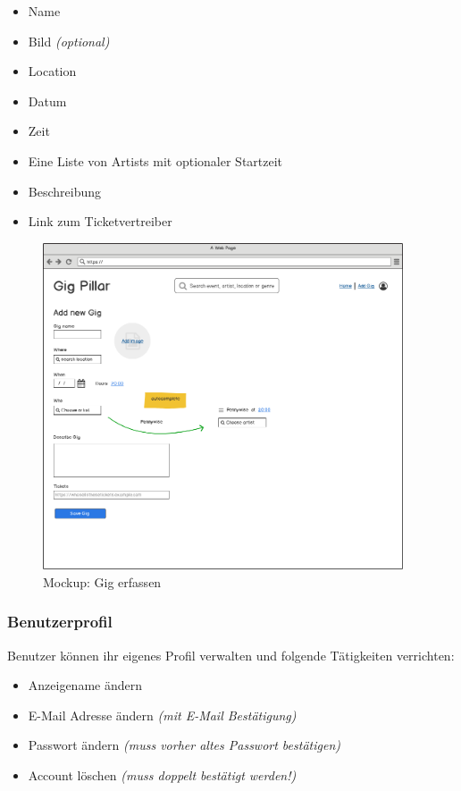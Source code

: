 \begin{itemize}
  \tightlist{}
  \item{} Name
  \item{} Bild \textit{(optional)}
  \item{} Location
  \item{} Datum
  \item{} Zeit
  \item{} Eine Liste von Artists mit optionaler Startzeit
  \item{} Beschreibung
  \item{} Link zum Ticketvertreiber
\end{itemize}

\begin{figure}[!htb]
  \centering
  \includegraphics[width=0.95\textwidth]{mockups/add-gig.png}
  \caption{Mockup: Gig erfassen}
\end{figure}

\clearpage
\subsubsection{Benutzerprofil}

Benutzer können ihr eigenes Profil verwalten und folgende Tätigkeiten
verrichten:

\begin{itemize}
  \tightlist{}
  \item{} Anzeigename ändern
  \item{} E-Mail Adresse ändern \textit{(mit E-Mail Bestätigung)}
  \item{} Passwort ändern \textit{(muss vorher altes Passwort bestätigen)}
  \item{} Account löschen \textit{(muss doppelt bestätigt werden!)}
\end{itemize}

